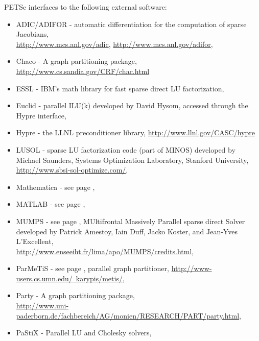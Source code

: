 \vspace{.3in}
\noindent
PETSc interfaces to the following external software:
\begin{itemize}
  \item ADIC/ADIFOR -  automatic differentiation for the computation of sparse Jacobians,\\ 
                     \href{http://www.mcs.anl.gov/adic}{http://www.mcs.anl.gov/adic},
                     \href{http://www.mcs.anl.gov/adifor}{http://www.mcs.anl.gov/adifor},
  \item Chaco -     A graph partitioning package, \href{ http://www.cs.sandia.gov/CRF/chac.html}{ http://www.cs.sandia.gov/CRF/chac.html}
  \item ESSL -         IBM's math library for fast sparse direct LU factorization,
  \item Euclid  -   parallel ILU(k) developed by David Hysom, accessed through the Hypre interface,
  \item Hypre -    the LLNL preconditioner library, \href{http://www.llnl.gov/CASC/hypre}{http://www.llnl.gov/CASC/hypre}
  \item LUSOL -       sparse LU factorization code (part of MINOS) developed by Michael Saunders,
                      Systems Optimization Laboratory, Stanford University,
                     \href{http://www.sbsi-sol-optimize.com/}{http://www.sbsi-sol-optimize.com/},
  \item Mathematica -  see page \pageref{ch_mathematica},
  \item MATLAB -      see page \pageref{ch_matlab},
  \item MUMPS -      see page \pageref{sec_externalsol}, MUltifrontal Massively Parallel sparse direct Solver developed by Patrick Amestoy, 
                     Iain Duff, Jacko Koster, and Jean-Yves L'Excellent, \\
                     \href{http://www.enseeiht.fr/lima/apo/MUMPS/credits.html}{http://www.enseeiht.fr/lima/apo/MUMPS/credits.html},
  \item ParMeTiS -     see page \pageref{sec_partitioning}, parallel graph partitioner,
                     \href{http://www-users.cs.umn.edu/~karypis/metis/}{http://www-users.cs.umn.edu/~karypis/metis/},
  \item Party -     A graph partitioning package, \\ \href{http://www.uni-paderborn.de/fachbereich/AG/monien/RESEARCH/PART/party.html}{http://www.uni-paderborn.de/fachbereich/AG/monien/RESEARCH/PART/party.html},
  \item PaStiX -     Parallel LU and Cholesky solvers,

\end{itemize}
